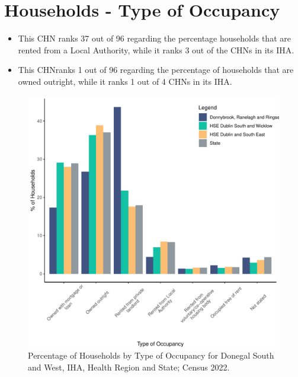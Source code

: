 \documentclass{article}
\begin{document}
\section{Households - Type of Occupancy}\label{sect:Households}
\begin{itemize}
\item This CHN ranks  37 out of 96 regarding the percentage households that are rented from a Local Authority, while it ranks  3 out of the CHNs in its IHA. 
\item This CHNranks  1 out of 96 regarding the percentage of households that are owned outright, while it ranks   1 out of 4 CHNs in its IHA.
\end{itemize}
\begin{figure}[H]
	\centering
	\includegraphics[width = 140mm]{../figures/HouseholdsED.pdf}
	\caption{Percentage of Households by Type of Occupancy for Donegal South and West, IHA, Health Region and State; Census 2022.}
	\label{fig:vbnv}
	\end{figure}
\end{document}
